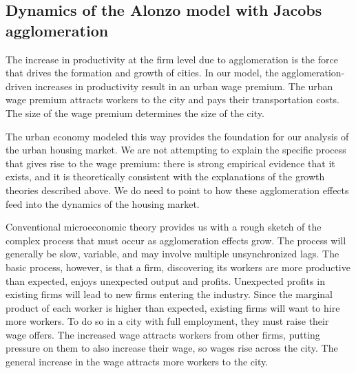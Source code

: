\subsection{Dynamics of the Alonzo model with Jacobs agglomeration}
The increase in productivity at the firm level due to agglomeration is the force that drives the formation and growth of cities. In our model, the agglomeration-driven increases in productivity result in an \gls{urban wage premium}. The urban wage premium attracts workers to the city and pays their transportation costs. The size of the wage premium determines the size of the city.

The urban economy modeled this way provides the foundation for our analysis of the urban housing market. We are not attempting to explain the specific process that gives rise to the wage premium: there is strong empirical evidence that it exists, and it is theoretically consistent with the explanations of the growth theories described above. We do need to point to how these agglomeration effects feed into the dynamics of the housing market.


Conventional microeconomic theory provides us with a rough sketch of the complex process that must occur as agglomeration effects grow. The process will generally be slow, variable, and may involve multiple unsynchronized lags. The basic process, however, is that a firm, discovering its workers are more productive than expected, enjoys unexpected output and profits. Unexpected profits in existing firms will lead to new firms entering the industry. Since the marginal product of each worker is higher than expected, existing firms will want to hire more workers. To do so in a city with full employment, they must raise their wage offers.   The increased wage attracts workers from other firms, putting pressure on them to also increase their wage, so wages rise across the city. The general increase in the wage attracts more workers to the city.

